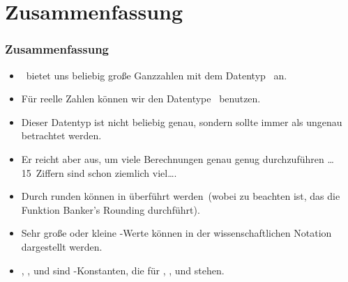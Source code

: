 \documentclass[aspectratio=169,mathserif,notheorems]{beamer}%
\begin{document}
\section{Zusammenfassung}%
%
\begin{frame}%
\frametitle{Zusammenfassung}%
\begin{itemize}%
\item \python\ bietet uns beliebig große Ganzzahlen mit dem Datentyp~ an.%
\item<2-> Für reelle Zahlen können wir den Datentype~ benutzen.%
\item<3-> Dieser Datentyp ist \alert{nicht} beliebig genau, sondern sollte \alert{immer} als ungenau betrachtet werden.%
\item<4-> Er reicht aber aus, um viele Berechnungen genau genug durchzuführen {\dots} 15~Ziffern sind schon ziemlich viel\dots.%
\item<5-> Durch runden können  in  überführt werden~(wobei zu beachten ist, das die Funktion  Banker's Rounding durchführt).%
\item<6-> Sehr große oder kleine -Werte können in der wissenschaftlichen Notation dargestellt werden.%
\item<7-> , , und  sind -Konstanten, die für , , und  stehen.%
\end{itemize}%
\end{frame}%
%
\endPresentation%
\end{document}
